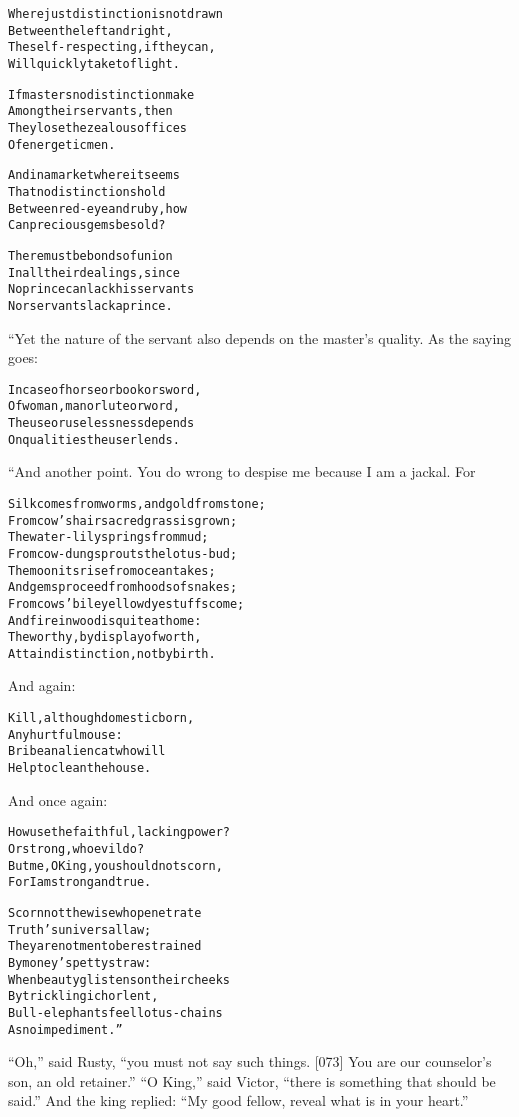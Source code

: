 \documentclass{article}
\renewenvironment{verbatim}{\begin{alltt}\normalfont\begin{centering}}{\end{centering}\end{alltt}}
\begin{document}
\begin{verbatim}
Where just distinction is not drawn
    Between the left and right,
The self-respecting, if they can,
    Will quickly take to flight.

If masters no distinction make
    Among their servants, then
They lose the zealous offices
    Of energetic men.

And in a market where it seems
    That no distinctions hold
Between red-eye and ruby, how
    Can precious gems be sold?

There must be bonds of union
    In all their dealings, since
No prince can lack his servants
    Nor servants lack a prince.
\end{verbatim}
“Yet the nature of the servant also depends on the master's
quality. As the saying goes:

\begin{verbatim}
In case of horse or book or sword,
Of woman, man or lute or word,
The use or uselessness depends
On qualities the user lends.
\end{verbatim}
“And another point. You do wrong to despise me because I am a
jackal. For

\begin{verbatim}
Silk comes from worms, and gold from stone;
From cow's hair sacred grass is grown;
The water-lily springs from mud;
From cow-dung sprouts the lotus-bud;
The moon its rise from ocean takes;
And gems proceed from hoods of snakes;
From cows' bile yellow dyestuffs come;
And fire in wood is quite at home:
The worthy, by display of worth,
Attain distinction, not by birth.
\end{verbatim}
And again:

\begin{verbatim}
Kill, although domestic born,
    Any hurtful mouse:
Bribe an alien cat who will
    Help to clean the house.
\end{verbatim}
And once again:

\begin{verbatim}
How use the faithful, lacking power?
    Or strong, who evil do?
But me, O King, you should not scorn,
    For I am strong and true.

Scorn not the wise who penetrate
    Truth's universal law;
They are not men to be restrained
    By money's petty straw:
When beauty glistens on their cheeks
    By trickling ichor lent,
Bull-elephants feel lotus-chains
    As no impediment.”
\end{verbatim}
``Oh,'' said Rusty,
``you must not say such things. [073] You are our counselor's son, an old retainer.''
``O King,'' said Victor,
``there is something that should be said.'' And the king replied:
``My good fellow, reveal what is in your heart.''
\end{document}
